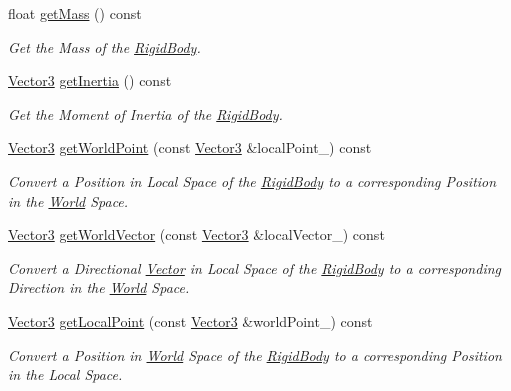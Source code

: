 \begin{DoxyCompactItemize}
float \hyperlink{class_magnum_1_1_physics3_1_1_vehicle_a169778611810c1f97f81b419f3badc0b}{get\+Mass} () const 
\begin{DoxyCompactList}\small\item\em Get the Mass of the \hyperlink{class_magnum_1_1_physics3_1_1_rigid_body}{Rigid\+Body}. \end{DoxyCompactList}\item 
\hyperlink{class_magnum_1_1_vector3}{Vector3} \hyperlink{class_magnum_1_1_physics3_1_1_vehicle_a902016b31fdff81c559e95366d276603}{get\+Inertia} () const 
\begin{DoxyCompactList}\small\item\em Get the Moment of Inertia of the \hyperlink{class_magnum_1_1_physics3_1_1_rigid_body}{Rigid\+Body}. \end{DoxyCompactList}\item 
\hyperlink{class_magnum_1_1_vector3}{Vector3} \hyperlink{class_magnum_1_1_physics3_1_1_vehicle_ae5cb89d84d8dd8a20ac43861938d281a}{get\+World\+Point} (const \hyperlink{class_magnum_1_1_vector3}{Vector3} \&local\+Point\+\_\+) const 
\begin{DoxyCompactList}\small\item\em Convert a Position in Local Space of the \hyperlink{class_magnum_1_1_physics3_1_1_rigid_body}{Rigid\+Body} to a corresponding Position in the \hyperlink{class_magnum_1_1_physics3_1_1_world}{World} Space. \end{DoxyCompactList}\item 
\hyperlink{class_magnum_1_1_vector3}{Vector3} \hyperlink{class_magnum_1_1_physics3_1_1_vehicle_a94eea6437fb5a6588c781fdf13c1de59}{get\+World\+Vector} (const \hyperlink{class_magnum_1_1_vector3}{Vector3} \&local\+Vector\+\_\+) const 
\begin{DoxyCompactList}\small\item\em Convert a Directional \hyperlink{class_magnum_1_1_vector}{Vector} in Local Space of the \hyperlink{class_magnum_1_1_physics3_1_1_rigid_body}{Rigid\+Body} to a corresponding Direction in the \hyperlink{class_magnum_1_1_physics3_1_1_world}{World} Space. \end{DoxyCompactList}\item 
\hyperlink{class_magnum_1_1_vector3}{Vector3} \hyperlink{class_magnum_1_1_physics3_1_1_vehicle_abca19784232251857ea4c751d80c3265}{get\+Local\+Point} (const \hyperlink{class_magnum_1_1_vector3}{Vector3} \&world\+Point\+\_\+) const 
\begin{DoxyCompactList}\small\item\em Convert a Position in \hyperlink{class_magnum_1_1_physics3_1_1_world}{World} Space of the \hyperlink{class_magnum_1_1_physics3_1_1_rigid_body}{Rigid\+Body} to a corresponding Position in the Local Space. \end{DoxyCompactList}\item 

\end{DoxyCompactItemize}
